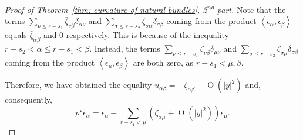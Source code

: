 \documentclass[a4paper]{amsart}
\theoremstyle{plain}%
\theoremstyle{definition}
\theoremstyle{remark}
\begin{document}
\begin{proof}[Proof of Theorem~\ref{thm: curvature of natural bundles}, 2\textsuperscript{nd} part]
	Note that the terms $ \sum_{\nu \le r - s_1} \bar{\zeta}_{\nu\beta} \delta_{\alpha\nu} $ and  $ \sum_{\sigma \le r - s_2} {\zeta}_{\sigma\alpha} \delta_{\sigma\beta} $ coming from the product $ \left< \epsilon_\alpha, \epsilon_\beta \right> $ equals $ \bar{\zeta}_{\alpha\beta} $ and 0 respectively.
	This is because of the inequality $ r - s_2 < \alpha \le r - s_1 < \beta $.
	Instead, the terms $ \sum_{\nu \le r - s_1} \bar{\zeta}_{\nu\beta} \delta_{\mu\nu} $ and  $ \sum_{\sigma \le r - s_2} {\zeta}_{\sigma\mu} \delta_{\sigma\beta} $ coming from the product $ \left< \epsilon_\mu, \epsilon_\beta \right> $ are both zero, as $ r-s_1 < \mu, \beta $.
	
	Therefore, we have obtained the equality $ u_{\alpha\beta} = - \bar{\zeta}_{\alpha\beta} + \operatorname{O}(|y|^2) $ and, consequently,
	\[
	p^{\star} \tilde{\epsilon}_\alpha = \epsilon_\alpha - \sum_{r-s_1 < \mu} \left( \bar{\zeta}_{\alpha\mu} + \operatorname{O}(|y|^2) \right) \epsilon_\mu .
	\]
	

\end{proof}
\end{document}
